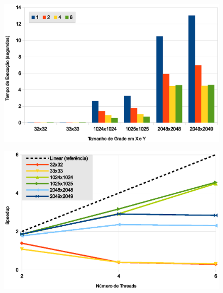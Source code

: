 \begin{figure}[H]
    \centering
    \begin{minipage}{.5\textwidth}
        \includegraphics[width=\textwidth]{figures/exectime-v3}
        \label{subfig:exectime-v3}
    \end{minipage}%
    \begin{minipage}{.5\textwidth}
        \includegraphics[width=\textwidth]{figures/speedup-v3}
        \label{subfig:speedup-v3}
    \end{minipage}


\end{figure}
